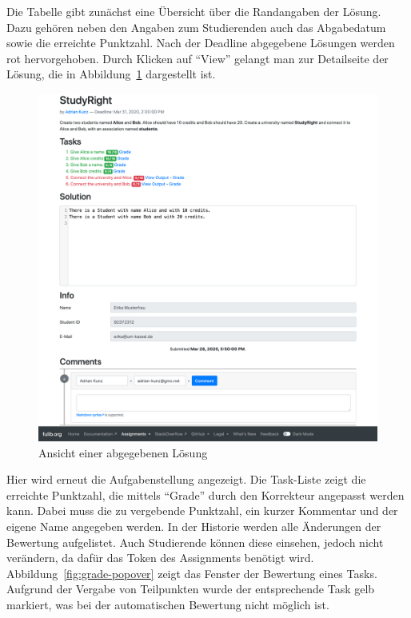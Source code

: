 Die Tabelle gibt zunächst eine Übersicht über die Randangaben der Lösung.
Dazu gehören neben den Angaben zum Studierenden auch das Abgabedatum sowie die erreichte Punktzahl.
Nach der Deadline abgegebene Lösungen werden rot hervorgehoben.
Durch Klicken auf ``View'' gelangt man zur Detailseite der Lösung, die in Abbildung~\ref{fig:solution} dargestellt ist.

\begin{figure}
    \centering
    \includegraphics[width=\textwidth]{chapter/fulib.org/img/solution.png}
    \caption{Ansicht einer abgegebenen Lösung}
    \label{fig:solution}
\end{figure}

Hier wird erneut die Aufgabenstellung angezeigt.
Die Task-Liste zeigt die erreichte Punktzahl, die mittels ``Grade'' durch den Korrekteur angepasst werden kann.
Dabei muss die zu vergebende Punktzahl, ein kurzer Kommentar und der eigene Name angegeben werden.
In der Historie werden alle Änderungen der Bewertung aufgelistet.
Auch Studierende können diese einsehen, jedoch nicht verändern, da dafür das Token des Assignments benötigt wird.
Abbildung~\ref{fig:grade-popover} zeigt das Fenster der Bewertung eines Tasks.
Aufgrund der Vergabe von Teilpunkten wurde der entsprechende Task gelb markiert, was bei der automatischen Bewertung nicht möglich ist.

